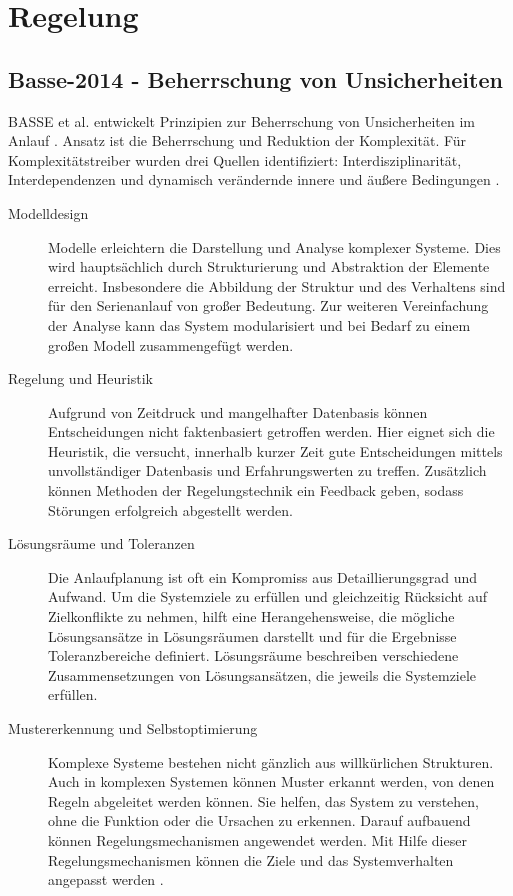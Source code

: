 \section{Regelung}
\subsection*{Basse-2014 - Beherrschung von Unsicherheiten}

BASSE et al. entwickelt Prinzipien zur Beherrschung von Unsicherheiten im Anlauf \autocite{Basse2014a}. Ansatz ist die Beherrschung und Reduktion der Komplexität. Für Komplexitätstreiber wurden drei Quellen identifiziert: Interdisziplinarität, Interdependenzen und dynamisch verändernde innere und äußere Bedingungen \autocite{Basse2014a, Gartzen2012, Schuh2008}. 
\begin{description}
\item[Modelldesign] Modelle erleichtern die Darstellung und Analyse komplexer Systeme. Dies wird hauptsächlich durch Strukturierung und Abstraktion der Elemente erreicht. 
Insbesondere die Abbildung der Struktur und des Verhaltens sind für den Serienanlauf von großer Bedeutung. Zur weiteren Vereinfachung der Analyse kann das System modularisiert und bei Bedarf zu einem großen Modell zusammengefügt werden. 

\item[Regelung und Heuristik] Aufgrund von Zeitdruck und mangelhafter Datenbasis können Entscheidungen nicht faktenbasiert getroffen werden. Hier eignet sich die Heuristik, die versucht, innerhalb kurzer Zeit gute Entscheidungen mittels unvollständiger Datenbasis und Erfahrungswerten zu treffen. Zusätzlich können Methoden der Regelungstechnik ein Feedback geben, sodass Störungen erfolgreich abgestellt werden.

\item[Lösungsräume und Toleranzen]
Die Anlaufplanung ist oft ein Kompromiss aus Detaillierungsgrad und Aufwand. Um die Systemziele zu erfüllen und gleichzeitig Rücksicht auf Zielkonflikte zu nehmen, hilft eine Herangehensweise, die mögliche Lösungsansätze in Lösungsräumen darstellt und für die Ergebnisse Toleranzbereiche definiert. Lösungsräume beschreiben verschiedene Zusammensetzungen von Lösungsansätzen, die jeweils die Systemziele erfüllen. 

\item[Mustererkennung und Selbstoptimierung]
Komplexe Systeme bestehen nicht gänzlich aus willkürlichen Strukturen. Auch in komplexen Systemen können Muster erkannt werden, von denen Regeln abgeleitet werden können. Sie helfen, das System zu verstehen, ohne die Funktion oder die Ursachen zu erkennen. Darauf aufbauend können Regelungsmechanismen angewendet werden. Mit Hilfe dieser Regelungsmechanismen können die Ziele und das Systemverhalten angepasst werden \autocite{Frank2009}. 
\end{description}

